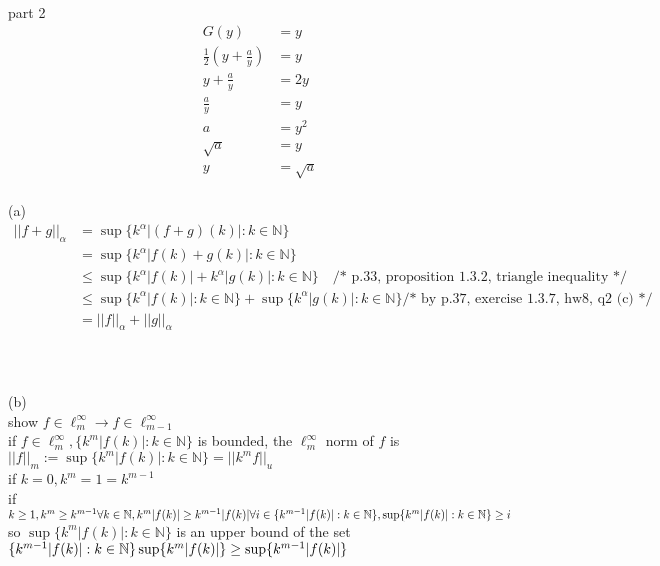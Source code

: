 \documentclass[12pt, border = 4pt, multi]{article} %
\begin{document}
\\
\\
\\
part 2
\begin{align*}
G(y) &= y\\
\frac{1}{2}\left(y + \frac{a}{y}\right) &= y\\
y + \frac{a}{y} &= 2y\\
\frac{a}{y} &= y\\
a &= y ^ 2\\
\sqrt{a} &= y\\
y &= \sqrt{a}
\end{align*}
\newpage
{}\\
(a)
\begin{align*}
||f + g||_{\alpha} &= \sup\{k ^ {\alpha} |(f + g)(k)|: k \in \mathbb{N}\}\\
&= \sup\{k ^ {\alpha} |f(k) + g(k)|: k \in \mathbb{N}\}\\
&\leq \sup\{k ^ {\alpha} |f(k)| + k ^ {\alpha} |g(k)|: k \in \mathbb{N}\} \quad \text{/* p.33, proposition 1.3.2, triangle inequality */}\\
&\leq \sup\{k ^ {\alpha} |f(k)|: k \in \mathbb{N}\} + \sup\{k ^ {\alpha} |g(k)|: k \in \mathbb{N}\} \text{/* by p.37, exercise 1.3.7, hw8, q2 (c) */}\\
&= ||f||_{\alpha} + ||g||_{\alpha}
\end{align*}
\\
\\
\\
(b)\\
show $f \in \ell_m ^ {\infty} \rightarrow f \in \ell_{m - 1} ^ {\infty}$\\
if $f \in \ell_m ^ {\infty}, \{k ^ m |f(k)|: k \in \mathbb{N}\}$ is bounded, the $\ell_m ^ {\infty}$ norm of $f$ is\\
$||f||_m := \sup\{k ^ m|f(k)|: k \in \mathbb{N}\} = ||k ^ m f||_u$\\
if $k = 0, k ^ m = 1 = k ^ {m - 1}$\\
if $k \geq 1, k ^ m \geq k ^ {m - 1}\\
\forall k \in \mathbb{N}, k ^ m|f(k)| \geq k ^ {m - 1}|f(k)|\\
\forall i \in \{k ^ {m - 1}|f(k)|: k \in \mathbb{N}\}, \sup\{k ^ m|f(k)|: k \in \mathbb{N}\} \geq i$\\
so $\sup\{k ^ m|f(k)|: k \in \mathbb{N}\}$ is an upper bound of the set $\{k ^ {m - 1}|f(k)|: k \in \mathbb{N}\}\\
\sup\{k ^ m|f(k)|\} \geq \sup\{k ^ {m - 1}|f(k)|\}\\$
\end{document}
